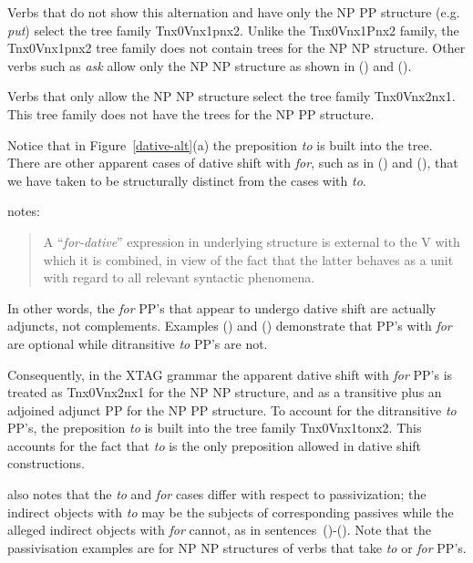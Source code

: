 Verbs that do not show this alternation and have only the NP PP structure
(e.g. {\it put\/}) select the tree family Tnx0Vnx1pnx2.  Unlike the
Tnx0Vnx1Pnx2 family, the Tnx0Vnx1pnx2 tree family does not contain trees for
the NP NP structure. Other verbs such as {\it ask} allow only the NP NP
structure as shown in () and ().


Verbs that only allow the NP NP structure select the tree family
Tnx0Vnx2nx1. This tree family does not have the trees for the NP PP
structure. 

Notice that in Figure~\ref{dative-alt}(a) the preposition {\it to\/} is
built into the tree.  There are other apparent cases of dative shift
with {\it for}, such as in () and (), that we have taken to
be structurally distinct from the cases with {\it to}.  


\cite{mccawley88} notes:

\begin{quote}
A ``{\it for-dative}'' expression in underlying structure is external
to the V with which it is combined, in view of the fact that the
latter behaves as a unit with regard to all relevant syntactic
phenomena.
\end{quote}


In other words, the {\it for} PP's that appear to undergo dative shift are
actually adjuncts, not complements. Examples () and () demonstrate
that PP's with {\it for} are optional while ditransitive {\it to} PP's are not.


Consequently, in the XTAG grammar the apparent dative shift with {\it
  for} PP's is treated as Tnx0Vnx2nx1 for the NP NP structure, and as
a transitive plus an adjoined adjunct PP for the NP PP structure.  To
account for the ditransitive {\it to} PP's, the preposition {\it to}
is built into the tree family Tnx0Vnx1tonx2. This accounts for the
fact that {\it to} is the only preposition allowed in dative shift
constructions.

\cite{mccawley88} also notes that the {\it to} and {\it for} cases
differ with respect to passivization; the indirect objects with {\it
  to} may be the subjects of corresponding passives while the alleged
indirect objects with {\it for} cannot, as in
sentences~()-(). Note that the passivisation examples are
for NP NP structures of verbs that take {\it to} or {\it for} PP's.

